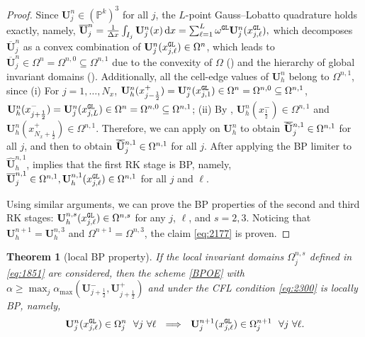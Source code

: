 \documentclass[times,final]{elsarticle}
\newtheorem{theorem}{Theorem}[section]
\numberwithin{equation}{section}
\theoremstyle{definition}
\theoremstyle{remark}
\newcommand{\BU}{\mathbf{U}}
\newcommand{\hBU}{\widehat{\BU}}
\newcommand{\oBU}{\overline{\BU}}
\newcommand{\toBU}{
	\mathrlap{
		\raisebox{1.2 pt}{$\overline{\phantom{\mathbf{U}}}$}
	}
	\mathrlap{
		\raisebox{-0.9 pt}{$\widetilde{\phantom{\mathbf{U}}}$}
	}
	\mathbf{U}
}
\newcommand{\hoBU}{
	\mathrlap{
		\raisebox{1.2 pt}{$\overline{\phantom{\mathbf{U}}}$}
	}
	\mathrlap{
		\raisebox{-0.9 pt}{$\widehat{\phantom{\mathbf{U}}}$}
	}
	\mathbf{U}
}
\begin{document}
\begin{proof}
	Since $\BU_j^n \in (\mathbb{P}^k)^3$ for all $j$, the $L$-point Gauss--Lobatto quadrature holds exactly, namely,
	$
	\oBU_j^n 
	= 
	\frac{1}{\Delta x} \int_{I_j} \BU^n_j(x) \, \textrm{d} x
	=
	\sum_{\ell = 1}^{L} \omega^{\tt GL} \BU^n_j(x^{\tt GL}_{j,\ell}),
	$
	which decomposes $\oBU_j^n$ as a convex combination of $\BU^n_j(x^{\tt GL}_{j,\ell}) \in \Omega^n$, which leads to $\oBU_j^n \in \Omega^{n} = \Omega^{n,0} \subseteq \Omega^{n,1}$ due to the convexity of $\Omega$ () and the hierarchy of global invariant domains ().
	Additionally, all the cell-edge values of $\BU^n_h$ belong to $\Omega^{n,1}$, since
	(i) For $j = 1,\dots,N_x$, $\BU^n_h(x_{j-\frac12}^{+}) = \BU^n_j(x^{\tt GL}_{j,1}) \in \Omega^{n} = \Omega^{n,0} \subseteq \Omega^{n,1}$, $\BU^n_h(x_{j+\frac12}^{-}) = \BU^n_j(x^{\tt GL}_{j,L}) \in \Omega^{n} = \Omega^{n,0} \subseteq \Omega^{n,1}$;
	(ii) By , $\BU^n_h(x_{\frac12}^{-}) \in \Omega^{n,1}$ and $\BU^n_h(x_{N_x+\frac12}^{+}) \in \Omega^{n,1}$.
	Therefore, we can apply  on $\BU^n_h$ to obtain $\toBU^{n,1}_j \in \Omega^{n,1}$ for all $j$,
	and then  to obtain $\hoBU^{n,1}_j \in \Omega^{n,1}$ for all $j$.
	After applying the BP limiter to $\hBU^{n,1}_h$,  implies that the first RK stage is BP, namely, $\oBU^{n,1}_j \in \Omega^{n,1}, \BU^{n,1}_h(x^{\tt GL}_{j,\ell}) \in \Omega^{n,1}$ for all $j$ and $\ell$.
	
	Using similar arguments, we can prove the BP properties of the second and third RK stages:
	$\BU^{n,s}_h(x^{\tt GL}_{j,\ell}) \in \Omega^{n,s}$ for any $j$, $\ell$, and $s = 2,3$.
	Noticing that $\BU^{n+1}_h = \BU^{n,3}_h$ and $\Omega^{n+1} = \Omega^{n,3}$, the claim \eqref{eq:2177} is proven.
\end{proof}

\begin{theorem}[local BP property]\label{lem:2394}
	If the local invariant domains $\Omega^{n,s}_j$ defined in \eqref{eq:1851} are considered, then the scheme \eqref{BPOE} with $\alpha \ge \max_j \alpha_{\max}(\BU^-_{j+\frac12},\BU^+_{j+\frac12})$ and under the CFL condition \eqref{eq:2300} is locally BP, namely,
	\begin{equation}\label{eq:2274}
		\BU^n_j(x^{\tt GL}_{j,\ell}) \in \Omega^{n}_j
		~~ \forall j ~ \forall \ell
		~~ \Longrightarrow ~~
		\BU^{n+1}_j(x^{\tt GL}_{j,\ell}) \in \Omega^{n+1}_j
		~~ \forall j ~ \forall \ell.
	\end{equation}
\end{theorem}
\end{document}
